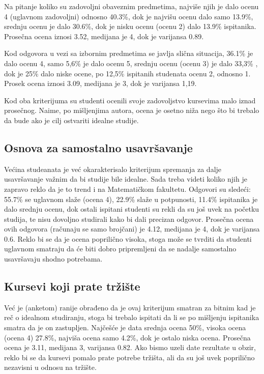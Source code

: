 \documentclass[a4paper]{article}
\begin{document}
Na pitanje koliko su zadovoljni obaveznim predmetima, najviše njih je dalo ocenu 4 (uglavnom zadovoljni) odnosno 40.3\%, dok je najvišu ocenu dalo samo 13.9\%, srednju ocenu je dalo 30.6\%, dok je nisku ocenu (ocenu 2) dalo 13.9\% ispitanika. Prosečna ocena iznosi 3.52, medijana je 4, dok je varijansa 0.89.

Kod odgovora u vezi sa izbornim predmetima se javlja slična situacija, 36.1\% je dalo ocenu 4, samo 5,6\% je dalo ocenu 5, srednju ocenu (ocenu 3) je dalo 33,3\% , dok je 25\% dalo niske ocene, po 12,5\% ispitanih studenata ocenu 2, odnosno 1. Prosek ocena iznosi 3.09, medijana je 3, dok je varijansa 1,19. 

Kod oba kriterijuma su studenti ocenili svoje zadovoljstvo kursevima malo iznad prosečnog. Naime, po mišljenjima autora, ocena je osetno niža nego što bi trebalo da bude ako je cilj ostvariti idealne studije.

\subsection{Osnova za samostalno usavršavanje}
Većina studeanata je već okarakterisalo kriterijum spremanja za dalje usavršavanje važnim da bi studije bile idealne. Sada treba videti koliko njih je zapravo reklo da je to trend i na Matematičkom fakultetu.
Odgovori su sledeći: 55.7\%  se uglavnom slaže (ocena 4), 22.9\% slaže u potpunosti,  11.4\%  ispitanika je dalo srednju ocenu, dok ostali ispitani studenti su rekli da su još uvek na početku studija, te nisu dovoljno studirali kako bi dali precizan odgovor. Prosečna ocena ovih odgovora (računaju se samo brojčani) je  4.12, medijana je 4, dok je varijansa 0.6. Reklo bi se da je ocena poprilično visoka, stoga može se tvrditi da studenti uglavnom smatraju da će biti dobro pripremljeni da se nadalje samostalno usavršavaju shodno potrebama.


\subsection{Kursevi koji prate tržište}
\label{sec:naslovN}

Već je (anketom) ranije obrađeno da je ovaj kriterijum smatran za bitnim kad je reč o idealnom studiranju, stoga bi trebalo ispitati da li se po mišljenju ispitanika smatra da je on zastupljen. Najčešće je data srednja ocena 50\%, visoka ocena (ocena 4) 27.8\%, najviša ocena samo 4.2\%, dok je ostalo niska ocena. Prosečna ocena je 3.11, medijana 3, varijansa 0.82. Ako bismo uzeli date rezultate u obzir, reklo bi se da kursevi pomalo prate potrebe tržišta, ali da su još uvek poprilično nezavisni u odnosu na tržište.
\end{document}
